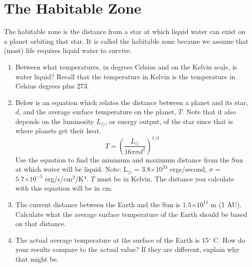 \documentclass[12pt]{article}%
\providecommand{\e}[1]{\ensuremath{\times 10^{#1}}} %
\begin{document}
\section{The Habitable Zone}

The habitable zone is the distance from a star at which liquid water can exist on a planet orbiting that star.  
It is called the habitable zone because we assume that (most) life requires liquid water to survive.

\begin{enumerate}

\item Between what temperatures, in degrees Celsius and on the Kelvin scale, is water liquid?  
Recall that the temperature in Kelvin is the temperature in Celsius degrees plus 273.

\item Below is an equation which relates the distance between a planet and its star, $d$, and the average surface temperature on the planet, $T$. 
Note that it also depends on the luminosity $L_{\odot}$, or energy output, of the star since that is where planets get their heat.
$$ T = \left( \frac{L_{\odot}}{16 \pi \sigma d^{2}} \right) ^{1/4} $$
Use the equation to find the minimum and maximum distance from the Sun at which water will be liquid.  
Note: L$_{\odot}$ = $3.8 \e{33}$ ergs/second, $\sigma$ = $5.7 \e{-5}$ erg/s/cm$^{2}$/K$^{4}$.  
$T$ must be in Kelvin.  
The distance you calculate with this equation will be in cm.  


\item The current distance between the Earth and the Sun is $1.5 \e{11}$ m (1 AU).  
Calculate what the average surface temperature of the Earth should be based on that distance.


\item The actual average temperature at the surface of the Earth is 15$^{\circ}$ C.  
How do your results compare to the actual value?  
If they are different, explain why that might be.


\end{enumerate}
\end{document}
